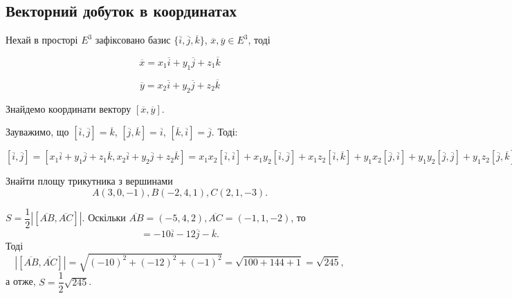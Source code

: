 \subsection{Векторний добуток в координатах}

Нехай в просторі $E^3$ зафіксовано базис $\{\overline{i}, \overline{j}, \overline{k}\}$, $\overline{x}, \overline{y} \in E^3$, тоді 

$$\overline{x} = x_1\overline{i} + y_1\overline{j} + z_1\overline{k}$$

$$\overline{y} = x_2\overline{i} + y_2\overline{j} + z_2\overline{k}$$

Знайдемо координати вектору $[\overline{x}, \overline{y}]$.

Зауважимо, що $[\overline{i}, \overline{j}] = \overline{k}$, $[\overline{j}, \overline{k}] = \overline{i}$,
$[\overline{k}, \overline{i}] = \overline{j}$. Тоді:

\noindent$[\overline{i}, \overline{j}]
= [x_1\overline{i} + y_1\overline{j} + z_1\overline{k}
	, x_2\overline{i} + y_2\overline{j} + z_2\overline{k}]
= x_1 x_2[\overline{i},\overline{i}]
	+ x_1 y_2[\overline{i},\overline{j}]
	+ x_1 z_2[\overline{i},\overline{k}]
	+ y_1 x_2[\overline{j},\overline{i}]
	+ y_1 y_2[\overline{j},\overline{j}]
	+ y_1 z_2[\overline{j},\overline{k}]
	+ z_1 x_2[\overline{k},\overline{i}]
	+ z_1 y_2[\overline{k},\overline{j}]
	+ z_1 z_2[\overline{k},\overline{k}]
= (x_1 y_2 - x_2 y_1)[\overline{i},\overline{j}]
	+ (x_1 z_2 - x_2 z_1)[\overline{i},\overline{k}]
	+ (y_1 z_2 - y_2 z_1)[\overline{j},\overline{k}]
= (x_1 y_2 - x_2 y_1)\overline{k}
	+ (x_1 z_2 - x_2 z_1)\overline{j}
	+ (y_1 z_2 - y_2 z_1)\overline{i}
= (y_1 z_2 - y_2 z_1)\overline{i}
	+ (x_1 z_2 - x_2 z_1)\overline{j}
	+ (x_1 y_2 - x_2 y_1)\overline{k}.$

\begin{problem}
    Знайти площу трикутника з вершинами
    \begin{equation*}
        A(3, 0, -1), B(-2, 4, 1), C(2, 1, -3).
    \end{equation*}
\end{problem}
\begin{solution}
    $S = \dfrac{1}{2}|[\overline{AB},\overline{AC}]|$. Оскільки
    $\overline{AB} = (-5, 4, 2), \overline{AC} = (-1, 1, -2)$,
    то 
    \begin{equation*}
        [\overline{AB},\overline{AC}] = -10\overline{i} - 12\overline{j} - \overline{k}.
    \end{equation*}
    Тоді
    \begin{equation*}    
        |[\overline{AB},\overline{AC}]|
        = \sqrt{(-10)^2 + (-12)^2 + (-1)^2}
	= \sqrt{100 + 144 + 1} = \sqrt{245},
    \end{equation*}
    а отже, $S = \dfrac{1}{2}\sqrt{245}$.
\end{solution}

